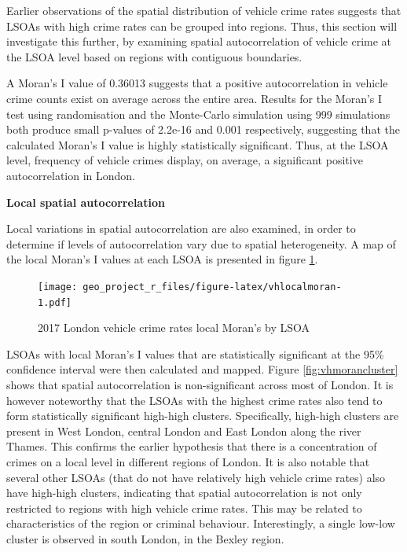 \documentclass[]{article}
\theoremstyle{definition}
\theoremstyle{definition}
\theoremstyle{definition}
\theoremstyle{remark}
\begin{document}
Earlier observations of the spatial distribution of vehicle crime rates
suggests that LSOAs with high crime rates can be grouped into regions.
Thus, this section will investigate this further, by examining spatial
autocorrelation of vehicle crime at the LSOA level based on regions with
contiguous boundaries.

A Moran's I value of 0.36013 suggests that a positive autocorrelation in
vehicle crime counts exist on average across the entire area. Results
for the Moran's I test using randomisation and the Monte-Carlo
simulation using 999 simulations both produce small p-values of 2.2e-16
and 0.001 respectively, suggesting that the calculated Moran's I value
is highly statistically significant. Thus, at the LSOA level, frequency
of vehicle crimes display, on average, a significant positive
autocorrelation in London.

\textbf{Local spatial autocorrelation}

Local variations in spatial autocorrelation are also examined, in order
to determine if levels of autocorrelation vary due to spatial
heterogeneity. A map of the local Moran's I values at each LSOA is
presented in figure \ref{fig:vhlocalmoran}.

\begin{figure}
\centering
\texttt{[image: geo\_project\_r\_files/figure-latex/vhlocalmoran-1.pdf]}
\caption{\label{fig:vhlocalmoran}2017 London vehicle crime rates local
Moran's by LSOA}
\end{figure}

LSOAs with local Moran's I values that are statistically significant at
the 95\% confidence interval were then calculated and mapped. Figure
\ref{fig:vhmorancluster} shows that spatial autocorrelation is
non-significant across most of London. It is however noteworthy that the
LSOAs with the highest crime rates also tend to form statistically
significant high-high clusters. Specifically, high-high clusters are
present in West London, central London and East London along the river
Thames. This confirms the earlier hypothesis that there is a
concentration of crimes on a local level in different regions of London.
It is also notable that several other LSOAs (that do not have relatively
high vehicle crime rates) also have high-high clusters, indicating that
spatial autocorrelation is not only restricted to regions with high
vehicle crime rates. This may be related to characteristics of the
region or criminal behaviour. Interestingly, a single low-low cluster is
observed in south London, in the Bexley region.
\end{document}
